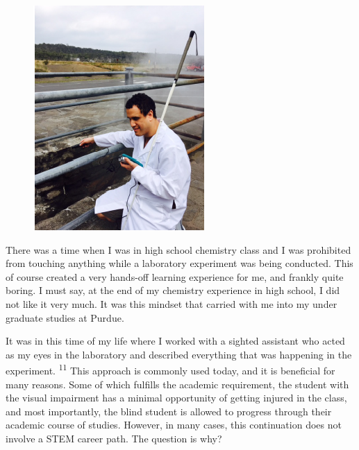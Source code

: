 \documentclass[11.5pt]{sig-alternate} %
\begin{document}
\begin{large}
\begin{figure}[h]
    \centering
    \includegraphics[width=1\linewidth]{fig1.png}
\end{figure}

There was a time when I was in high school chemistry class and I was prohibited from touching anything while a laboratory experiment was being conducted. This of course created a very hands-off learning experience for me, and frankly quite boring. I must say, at the end of my chemistry experience in high school, I did not like it very much. It was this mindset that carried with me into my under graduate studies at Purdue.

It was in this time of my life where I worked with a sighted assistant who acted as my eyes in the laboratory and described everything that was happening in the experiment. \textsuperscript{11} This approach is commonly used today, and it is beneficial for many reasons. Some of which fulfills the academic requirement, the student with the visual impairment has a minimal opportunity of getting injured in the class, and most importantly, the blind student is allowed to progress through their academic course of studies. However, in many cases, this continuation does not involve a STEM career path. The question is why?


\end{large}
\end{document}
